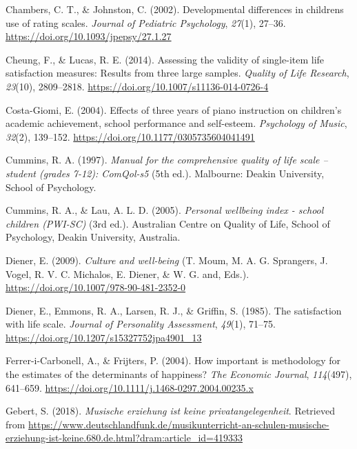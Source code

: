 \documentclass[a4, 12pt]{article}
\begin{document}
\leavevmode\hypertarget{ref-Johnston2002}{}%
Chambers, C. T., \& Johnston, C. (2002). Developmental differences in childrens use of rating scales. \emph{Journal of Pediatric Psychology}, \emph{27}(1), 27--36. \url{https://doi.org/10.1093/jpepsy/27.1.27}

\leavevmode\hypertarget{ref-Cheung2014}{}%
Cheung, F., \& Lucas, R. E. (2014). Assessing the validity of single-item life satisfaction measures: Results from three large samples. \emph{Quality of Life Research}, \emph{23}(10), 2809--2818. \url{https://doi.org/10.1007/s11136-014-0726-4}

\leavevmode\hypertarget{ref-CostaGiomi2004}{}%
Costa-Giomi, E. (2004). Effects of three years of piano instruction on children's academic achievement, school performance and self-esteem. \emph{Psychology of Music}, \emph{32}(2), 139--152. \url{https://doi.org/10.1177/0305735604041491}

\leavevmode\hypertarget{ref-Cummins1997}{}%
Cummins, R. A. (1997). \emph{Manual for the comprehensive quality of life scale -- student (grades 7-12): ComQol-s5} (5th ed.). Malbourne: Deakin University, School of Psychology.

\leavevmode\hypertarget{ref-Cummins2005}{}%
Cummins, R. A., \& Lau, A. L. D. (2005). \emph{Personal wellbeing index - school children (PWI-SC)} (3rd ed.). Australian Centre on Quality of Life, School of Psychology, Deakin University, Australia.

\leavevmode\hypertarget{ref-Diener2009}{}%
Diener, E. (2009). \emph{Culture and well-being} (T. Moum, M. A. G. Sprangers, J. Vogel, R. V. C. Michalos, E. Diener, \& W. G. and, Eds.). \url{https://doi.org/10.1007/978-90-481-2352-0}

\leavevmode\hypertarget{ref-Diener1985}{}%
Diener, E., Emmons, R. A., Larsen, R. J., \& Griffin, S. (1985). The satisfaction with life scale. \emph{Journal of Personality Assessment}, \emph{49}(1), 71--75. \url{https://doi.org/10.1207/s15327752jpa4901_13}

\leavevmode\hypertarget{ref-iCarbonell2004}{}%
Ferrer-i-Carbonell, A., \& Frijters, P. (2004). How important is methodology for the estimates of the determinants of happiness? \emph{The Economic Journal}, \emph{114}(497), 641--659. \url{https://doi.org/10.1111/j.1468-0297.2004.00235.x}

\leavevmode\hypertarget{ref-Gebert2018}{}%
Gebert, S. (2018). \emph{Musische erziehung ist keine privatangelegenheit}. Retrieved from \url{https://www.deutschlandfunk.de/musikunterricht-an-schulen-musische-erziehung-ist-keine.680.de.html?dram:article_id=419333}
\end{document}
